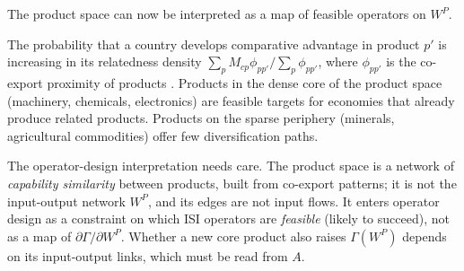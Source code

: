 \documentclass[../structural_economics_book.tex]{subfiles}
\begin{document}
The product space \citep{hidalgo2007product} can now be interpreted as a map of feasible operators on $W^P$.

\begin{stylizedfact}\label{ch15:prop:product_space}
The probability that a country develops comparative advantage in product $p'$ is increasing in its relatedness density $\sum_p M_{cp}\phi_{pp'}/\sum_p\phi_{pp'}$, where $\phi_{pp'}$ is the co-export proximity of products \citep{hidalgo2007product}. Products in the dense core of the product space (machinery, chemicals, electronics) are feasible targets for economies that already produce related products. Products on the sparse periphery (minerals, agricultural commodities) offer few diversification paths.
\end{stylizedfact}

The operator-design interpretation needs care. The product space is a network of \emph{capability similarity} between products, built from co-export patterns; it is not the input-output network $W^P$, and its edges are not input flows. It enters operator design as a constraint on which ISI operators are \emph{feasible} (likely to succeed), not as a map of $\partial\Gamma/\partial W^P$. Whether a new core product also raises $\Gamma(W^P)$ depends on its input-output links, which must be read from $A$.
\end{document}
